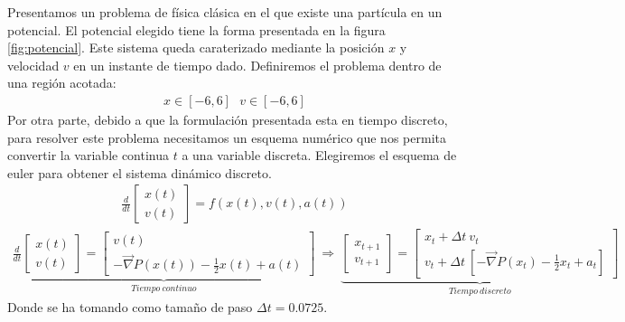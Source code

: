 \begin{example}\label{ParticulaPotencial}

    Presentamos un problema de física clásica en el que existe una partícula en un  potencial. El potencial elegido tiene la forma presentada en la figura \ref{fig:potencial}. Este sistema queda caraterizado mediante la posición $x$ y velocidad $v$ en un instante de tiempo dado. Definiremos el problema dentro de una región acotada: 
    \begin{gather}
        x \in [-6,6] \ \ \  v \in [-6,6] 
    \end{gather}
    Por otra parte, debido a que la formulación presentada esta en tiempo discreto, para resolver este problema necesitamos un esquema numérico que nos permita convertir la variable continua $t$ a una variable discreta. Elegiremos el esquema de euler para obtener el sistema dinámico discreto.
    \begin{gather}
        \frac{d}{dt}\begin{bmatrix}
            x(t) \\ v(t)
        \end{bmatrix} = f(x(t),v(t),a(t))
    \end{gather}
    \begin{gather}
        \underbrace{
            \frac{d}{dt}\begin{bmatrix}
                x(t) \\ v(t)
            \end{bmatrix} =
            \begin{bmatrix}
                v(t) \\ -\vec{\nabla}P(x(t))  - \frac{1}{2}x(t) + a(t)
            \end{bmatrix}}_{Tiempo \ continuo}
        \ \Longrightarrow \
        \underbrace{
            \begin{bmatrix}
                x_{t+1} \\ v_{t+1}
            \end{bmatrix} =
            \begin{bmatrix}
                x_t +\Delta t  \ v_t \\
                v_t +\Delta t  \ [-\vec{\nabla}P(x_t)  - \frac{1}{2}x_t + a_t]
            \end{bmatrix}}_{Tiempo \ discreto}
    \end{gather}
    Donde se ha tomando como tamaño de paso $\Delta t = 0.0725$.\newline


\end{example}
